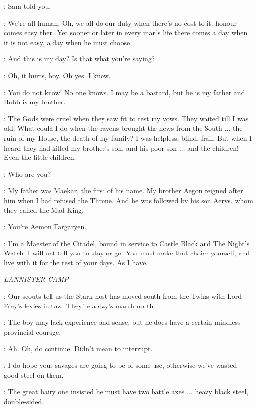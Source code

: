\JON: Sam told you. 

\AEMON: We're all human. Oh, we all do our duty when there's no cost to it. honour comes easy then. Yet sooner or later in every man's life there comes a day when it is not easy, a day when he must choose. 

\JON: And this is my day? Is that what you're saying? 

\AEMON: Oh, it hurts, boy. Oh yes. I know. 

\JON: You do not know! No one knows.  I may be a bastard, but he is my father and Robb is my brother. 

\AEMON: The Gods were cruel when they saw fit to test my vows. They waited till I was old. What could I do when the ravens brought the news from the South $\ldots$ the ruin of my House, the death of my family? I was helpless, blind, frail. But when I heard they had killed my brother's son, and his poor son $\ldots$ and the children! Even the little children. 

\JON: Who are you? 

\AEMON: My father was Maekar, the first of his name. My brother Aegon reigned after him when I had refused the Throne. And he was followed by his son Aerys, whom they called the Mad King. 

\JON: You're Aemon Targaryen. 

\AEMON: I'm a Maester of the Citadel, bound in service to Castle Black and The Night's Watch. I will not tell you to stay or go. You must make that choice yourself, and live with it for the rest of your days. As I have. 



\scene

\textit{LANNISTER CAMP} 


\KEVAN: Our scouts tell us the Stark host has moved south from the Twins with Lord Frey's levies in tow. They're a day's march north. 

\TYWIN: The boy may lack experience and sense, but he does have a certain mindless provincial courage. 

\TYRION: Ah. Oh, do continue. Didn't mean to interrupt. 

\TYWIN: I do hope your savages are going to be of some use, otherwise we've wasted good steel on them. 

\KEVAN: The great hairy one insisted he must have two battle axes $\ldots$ heavy black steel, double-sided. 


